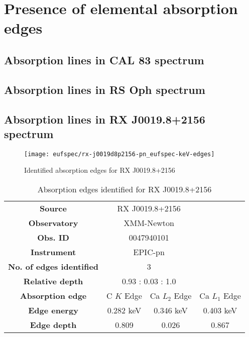 	\newpage
	\section{Presence of elemental absorption edges}
	
		\subsection*{Absorption lines in CAL 83 spectrum}
		
		\subsection*{Absorption lines in RS Oph spectrum}
		
		\newpage
		\subsection*{Absorption lines in RX J0019.8+2156 spectrum}
			\begin{figure}[h!]
				\centering
				\texttt{[image: eufspec/rx-j0019d8p2156-pn\_eufspec-keV-edges]}
				\caption{Identified absorption edges for RX J0019.8+2156}
				\label{result:absedge-rx-j0019}
			\end{figure}
			
			\renewcommand{\arraystretch}{1.5}
			\begin{table}[!htb]
				\centering
				\caption{Absorption edges identified for RX J0019.8+2156}
				\label{tab:absedge-rx-j0019}
				\begin{tabular}{cccc}
					\hline
					\textbf{Source} & \multicolumn{2}{c}{RX J0019.8+2156} & {} \\
					\textbf{Observatory} & \multicolumn{2}{c}{XMM-Newton}& {} \\
					\textbf{Obs. ID} & \multicolumn{2}{c}{0047940101}& {} \\
					\textbf{Instrument} & \multicolumn{2}{c}{EPIC-pn}& {} \\
					\textbf{No. of edges identified} & \multicolumn{2}{c}{3}& {} \\
					\textbf{Relative depth} & \multicolumn{2}{c}{0.93 : 0.03 : 1.0} & {} \\ \hline
					\textbf{Absorption edge} & {C $K$ Edge} & {Ca $L_2$ Edge} & {Ca $L_1$ Edge} \\
					\textbf{Edge energy} & {0.282 keV} & {0.346 keV} & {0.403 keV} \\
					\textbf{Edge depth} & {0.809} & {0.026} & {0.867} \\ \hline
				\end{tabular}
			\end{table}
		
